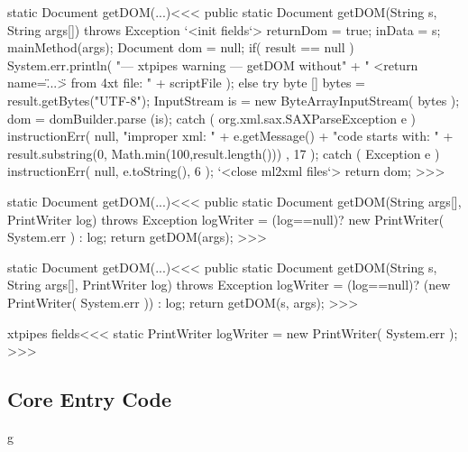 \documentclass{article}
\begin{document}
{\<static Document getDOM(...)\><<<
public static Document getDOM(String s, String args[]) 
                                           throws Exception {
   `<init fields`>
   returnDom = true;
   inData = s;
   mainMethod(args);
   Document dom = null;
   if( result == null ){
     System.err.println(
       "--- xtpipes warning --- getDOM without"
         + " <return name=\"...\"> from 4xt file: "
         + scriptFile );
   } else {
      try{
         byte [] bytes = result.getBytes("UTF-8");
         InputStream is =  new ByteArrayInputStream( bytes );
         dom = domBuilder.parse (is);
      } catch ( org.xml.sax.SAXParseException e ){
         instructionErr( null, "improper xml: " + e.getMessage() 
           + "\n code starts with: "
           + result.substring(0, Math.min(100,result.length()))
         , 17 );
      } catch ( Exception e ){
         instructionErr( null, e.toString(), 6 );
      }  
      `<close ml2xml files`>
   }
   return dom;
} 
>>>


\<static Document getDOM(...)\><<<
public static Document getDOM(String args[], PrintWriter log) 
                               throws Exception {
   logWriter = (log==null)? new PrintWriter( System.err ) : log;
   return getDOM(args);
}
>>>

\<static Document getDOM(...)\><<<
public static Document getDOM(String s, String args[], PrintWriter log) 
                                           throws Exception {
   logWriter = (log==null)? (new PrintWriter( System.err )) : log;
   return getDOM(s, args);
}
>>>




\<xtpipes fields\><<<
static PrintWriter logWriter = new PrintWriter( System.err );
>>>




\subsection{Core Entry Code}
g

}
\end{document}
